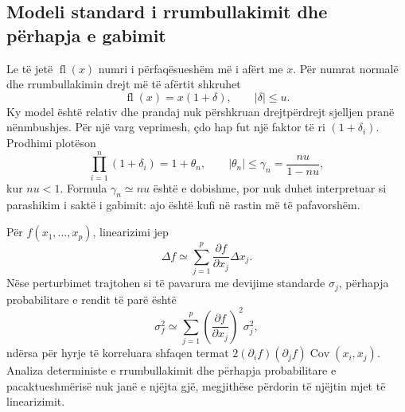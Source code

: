 \documentclass[11pt,oneside,openany]{book}
\begin{document}
\subsection{Modeli standard i rrumbullakimit dhe përhapja e gabimit}
Le të jetë $\operatorname{fl}(x)$ numri i përfaqësueshëm më i afërt me $x$. Për numrat normalë dhe rrumbullakimin drejt më të afërtit shkruhet
\begin{equation}
 \operatorname{fl}(x)=x(1+\delta),\qquad |\delta|\le u.
\end{equation}
Ky model është relativ dhe prandaj nuk përshkruan drejtpërdrejt sjelljen pranë nënmbushjes. Për një varg veprimesh, çdo hap fut një faktor të ri $(1+\delta_i)$. Prodhimi plotëson
\begin{equation}
 \prod_{i=1}^{n}(1+\delta_i)=1+\theta_n,\qquad
 |\theta_n|\le\gamma_n=\frac{nu}{1-nu},
\end{equation}
kur $nu<1$. Formula $\gamma_n\simeq nu$ është e dobishme, por nuk duhet interpretuar si parashikim i saktë i gabimit: ajo është kufi në rastin më të pafavorshëm.

Për $f(x_1,\ldots,x_p)$, linearizimi jep
\begin{equation}
 \Delta f\simeq\sum_{j=1}^{p}\frac{\partial f}{\partial x_j}\Delta x_j.
\end{equation}
Nëse perturbimet trajtohen si të pavarura me devijime standarde $\sigma_j$, përhapja probabilitare e rendit të parë është
\begin{equation}
 \sigma_f^2\simeq\sum_{j=1}^{p}\left(\frac{\partial f}{\partial x_j}\right)^2\sigma_j^2,
\end{equation}
ndërsa për hyrje të korreluara shfaqen termat $2(\partial_i f)(\partial_j f)\operatorname{Cov}(x_i,x_j)$. Analiza deterministe e rrumbullakimit dhe përhapja probabilitare e pacaktueshmërisë nuk janë e njëjta gjë, megjithëse përdorin të njëjtin mjet të linearizimit.
\end{document}
